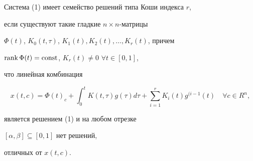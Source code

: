 \begin{defn} Система (1) имеет семейство решений типа Коши индекса $r$,


если существуют такие гладкие $n\times n$-матрицы


$\Phi(t)$, $K_0(t,\tau)$, $K_1(t),K_2(t),\dotsc,K_r(t)$, причем


$\operatorname{rank}\Phi(t)=\operatorname{const}$, $K_r(t)\ne 0$ $\forall t\in[0,1]$,


что линейная комбинация


$$


x(t,c)=\Phi(t)_c+\int^t_0 K(t,\tau)g(\tau)d\tau+


\sum^r_{i=1}K_i(t)g^{(i-1}(t)\quad \forall c\in R^n,


$$


является решением (1) и на любом отрезке


$[\alpha,\beta]\subseteq[0,1]$ нет решений,


отличных от $x(t,c)$.


\end{defn}





